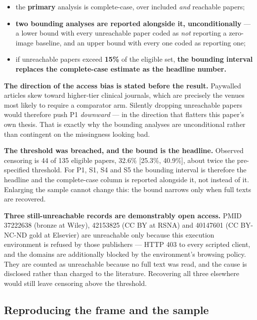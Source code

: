 \documentclass[11pt,a4paper]{article}
\begin{document}
\begin{itemize}
\item the \textbf{primary} analysis is complete-case, over included \emph{and}
reachable papers;
\item \textbf{two bounding analyses are reported alongside it, unconditionally} --- a
lower bound with every unreachable paper coded as \emph{not} reporting a zero-image
baseline, and an upper bound with every one coded as reporting one;
\item if unreachable papers exceed \textbf{15\%} of the eligible set, \textbf{the
bounding interval replaces the complete-case estimate as the headline number.}
\end{itemize}

\textbf{The direction of the access bias is stated before the result.} Paywalled
articles skew toward higher-tier clinical journals, which are precisely the venues
most likely to require a comparator arm. Silently dropping unreachable papers would
therefore push P1 \emph{downward} --- in the direction that flatters this paper's own
thesis. That is exactly why the bounding analyses are unconditional rather than
contingent on the missingness looking bad.

\textbf{The threshold was breached, and the bound is the headline.} Observed
censoring is 44 of 135 eligible papers, 32.6\% [25.3\%, 40.9\%], about twice the
pre-specified threshold. For P1, S1, S4 and S5 the bounding interval is therefore the
headline and the complete-case column is reported alongside it, not instead of it.
Enlarging the sample cannot change this: the bound narrows only when full texts are
recovered.

\textbf{Three still-unreachable records are demonstrably open access.} PMID 37222638
(bronze at Wiley), 42153825 (CC BY at RSNA) and 40147601 (CC BY-NC-ND gold at
Elsevier) are unreachable only because this execution environment is refused by those
publishers --- HTTP 403 to every scripted client, and the domains are additionally
blocked by the environment's browsing policy. They are counted as unreachable because
no full text was read, and the cause is disclosed rather than charged to the
literature. Recovering all three elsewhere would still leave censoring above the
threshold.

\subsection{Reproducing the frame and the sample}
\end{document}
